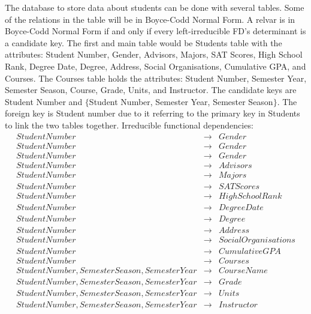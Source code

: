 \documentclass{article}
\title{HW#7}
\author{Tanner Hammond}
\date{October 2020}
\begin{document}
\maketitle

\newline The database to store data about students can be done with several tables. Some of the relations in the table will be in Boyce-Codd Normal Form. A relvar is in Boyce-Codd Normal Form if and only if every left-irreducible FD's determinant is a candidate key. The first and main table would be Students table with the attributes:
\newline Student Number, Gender, Advisors, Majors, SAT Scores, High School Rank, Degree Date, Degree, Address, Social Organisations, Cumulative GPA, and Courses.
\newline The Courses table holds the attributes:
\newline Student Number, Semester Year, Semester Season, Course, Grade, Units, and Instructor.
\newline The candidate keys are Student Number and $\{$Student Number, Semester Year, Semester Season$\}$. The foreign key is Student number due to it referring to the primary key in Students to link the two tables together.
\newline Irreducible functional dependencies:
\begin{eqnarray*}
      Student Number &\rightarrow& Gender \\
      Student Number &\rightarrow& Gender\\
      Student Number &\rightarrow& Gender\\
      Student Number &\rightarrow& Advisors\\
      Student Number &\rightarrow& Majors\\
      Student Number &\rightarrow& SAT Scores\\
      Student Number &\rightarrow& High School Rank\\
      Student Number &\rightarrow& Degree Date\\
      Student Number &\rightarrow& Degree\\
      Student Number &\rightarrow& Address\\
      Student Number &\rightarrow& Social Organisations\\
      Student Number &\rightarrow& Cumulative GPA\\
      Student Number &\rightarrow& Courses\\
      Student Number, Semester Season, Semester Year &\rightarrow& Course Name\\
      Student Number, Semester Season, Semester Year &\rightarrow& Grade\\
      Student Number, Semester Season, Semester Year &\rightarrow& Units\\
      Student Number, Semester Season, Semester Year &\rightarrow& Instructor
     \end{eqnarray*}
     
\end{document}
